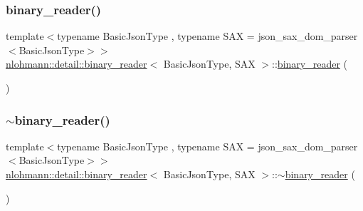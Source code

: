 \mbox{\label{classnlohmann_1_1detail_1_1binary__reader_a254d91b10c2f4579634b6f70ffc1ef16}} 
\subsubsection{\texorpdfstring{binary\_reader()}{binary\_reader()}\hspace{0.1cm}{\footnotesize\ttfamily [3/3]}}
{\footnotesize\ttfamily template$<$typename Basic\+Json\+Type , typename S\+AX  = json\+\_\+sax\+\_\+dom\+\_\+parser$<$\+Basic\+Json\+Type$>$$>$ \\
\mbox{\hyperlink{classnlohmann_1_1detail_1_1binary__reader}{nlohmann\+::detail\+::binary\+\_\+reader}}$<$ Basic\+Json\+Type, S\+AX $>$\+::\mbox{\hyperlink{classnlohmann_1_1detail_1_1binary__reader}{binary\+\_\+reader}} (\begin{DoxyParamCaption}\item[{\mbox{\hyperlink{classnlohmann_1_1detail_1_1binary__reader}{binary\+\_\+reader}}$<$ Basic\+Json\+Type, S\+AX $>$ \&\&}]{ }\end{DoxyParamCaption})\hspace{0.3cm}{\ttfamily [default]}}

\mbox{\label{classnlohmann_1_1detail_1_1binary__reader_a18e0a63e22dbdad5f6964276b81b813a}} 
\subsubsection{\texorpdfstring{$\sim$binary\_reader()}{~binary\_reader()}}
{\footnotesize\ttfamily template$<$typename Basic\+Json\+Type , typename S\+AX  = json\+\_\+sax\+\_\+dom\+\_\+parser$<$\+Basic\+Json\+Type$>$$>$ \\
\mbox{\hyperlink{classnlohmann_1_1detail_1_1binary__reader}{nlohmann\+::detail\+::binary\+\_\+reader}}$<$ Basic\+Json\+Type, S\+AX $>$\+::$\sim$\mbox{\hyperlink{classnlohmann_1_1detail_1_1binary__reader}{binary\+\_\+reader}} (\begin{DoxyParamCaption}{ }\end{DoxyParamCaption})\hspace{0.3cm}{\ttfamily [default]}}



